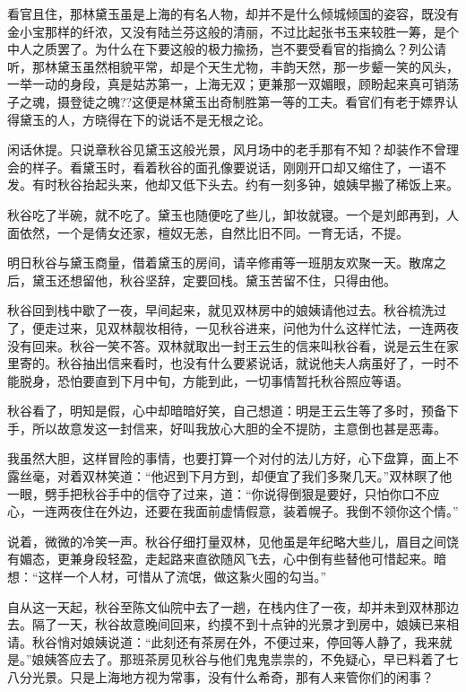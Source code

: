 \documentclass[12pt,UTF8]{ctexbook}
\begin{document}
{{{看官且住，那林黛玉虽是上海的有名人物，却并不是什么倾城倾国的姿容，既没有金小宝那样的纤浓，又没有陆兰芬这般的清丽，不过比起张书玉来较胜一筹，是个中人之质罢了。为什么在下要这般的极力揄扬，岂不要受看官的指摘么？列公请听，那林黛玉虽然相貌平常，却是个天生尤物，丰韵天然，那一步颦一笑的风头，一举一动的身段，真是姑苏第一，上海无双；更兼那一双媚眼，顾盼起来真可销荡子之魂，摄登徒之魄??这便是林黛玉出奇制胜第一等的工夫。看官们有老于嫖界认得黛玉的人，方晓得在下的说话不是无根之论。

闲话休提。只说章秋谷见黛玉这般光景，风月场中的老手那有不知？却装作不曾理会的样子。看黛玉时，看着秋谷的面孔像要说话，刚刚开口却又缩住了，一语不发。有时秋谷抬起头来，他却又低下头去。约有一刻多钟，娘姨早搬了稀饭上来。

秋谷吃了半碗，就不吃了。黛玉也随便吃了些儿，卸妆就寝。一个是刘郎再到，人面依然，一个是倩女还家，檀奴无恙，自然比旧不同。一育无话，不提。

明日秋谷与黛玉商量，借着黛玉的房间，请辛修甫等一班朋友欢聚一天。散席之后，黛玉还想留他，秋谷坚辞，定要回栈。黛玉苦留不住，只得由他。

秋谷回到栈中歇了一夜，早间起来，就见双林房中的娘姨请他过去。秋谷梳洗过了，便走过来，见双林靓妆相待，一见秋谷进来，问他为什么这样忙法，一连两夜没有回来。秋谷一笑不答。双林就取出一封王云生的信来叫秋谷看，说是云生在家里寄的。秋谷抽出信来看时，也没有什么要紧说话，就说他夫人病虽好了，一时不能脱身，恐怕要直到下月中旬，方能到此，一切事情暂托秋谷照应等语。

秋谷看了，明知是假，心中却暗暗好笑，自己想道：明是王云生等了多时，预备下手，所以故意发这一封信来，好叫我放心大胆的全不提防，主意倒也甚是恶毒。

我虽然大胆，这样冒险的事情，也要打算一个对付的法儿方好，心下盘算，面上不露丝毫，对着双林笑道：“他迟到下月方到，却便宜了我们多聚几天。”双林瞑了他一眼，劈手把秋谷手中的信夺了过来，道：“你说得倒狠是要好，只怕你口不应心，一连两夜住在外边，还要在我面前虚情假意，装着幌子。我倒不领你这个情。”

说着，微微的冷笑一声。秋谷仔细打量双林，见他虽是年纪略大些儿，眉目之间饶有媚态，更兼身段轻盈，走起路来直欲随风飞去，心中倒有些替他可惜起来。暗想：“这样一个人材，可惜从了流氓，做这紥火囤的勾当。”

自从这一天起，秋谷至陈文仙院中去了一趟，在栈内住了一夜，却并未到双林那边去。隔了一天，秋谷故意晚间回来，约摸不到十点钟的光景才到房中，娘姨已来相请。秋谷悄对娘姨说道：“此刻还有茶房在外，不便过来，停回等人静了，我来就是。”娘姨答应去了。那班茶房见秋谷与他们鬼鬼祟祟的，不免疑心，早已料着了七八分光景。只是上海地方视为常事，没有什么希奇，那有人来管你们的闲事？

}}}
\end{document}
